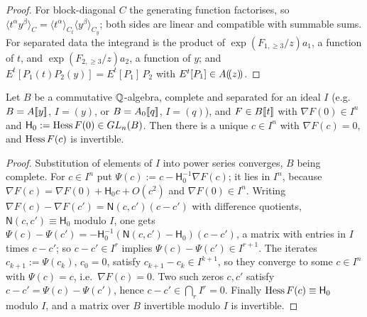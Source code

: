 \begin{proof}
For block-diagonal $C$ the generating function factorises, so $\langle t^\alpha y^\beta\rangle_C=\langle t^\alpha\rangle_{C_t}\langle y^\beta\rangle_{C_y}$; both sides are linear and compatible with summable sums. For separated data the integrand is the product of $\exp(F_{1,\geq3}/z)a_1$, a function of $t$, and $\exp(F_{2,\geq3}/z)a_2$, a function of $y$; and $E^t[P_1(t)P_2(y)]=E^t[P_1]\,P_2$ with $E^t[P_1]\in A(\!(z)\!)$.
\end{proof}

\begin{lem}
\label{lem:fsp-ift}
Let $B$ be a commutative $\mathbb{Q}$-algebra, complete and separated for an ideal $I$ (e.g.\ $B=A[\![ y ]\!]$, $I=(y)$, or $B=A_0[\![ q ]\!]$, $I=(q)$), and $F\in B[\![ t ]\!]$ with $\nabla F(0)\in I^n$ and $\mathsf H_0:=\operatorname{Hess} F(0)\in GL_n(B)$. Then there is a unique $c\in I^n$ with $\nabla F(c)=0$, and $\operatorname{Hess} F(c)$ is invertible.
\end{lem}

\begin{proof}
Substitution of elements of $I$ into power series converges, $B$ being complete. For $c\in I^n$ put $\Psi(c):=c-\mathsf H_0^{-1}\nabla F(c)$; it lies in $I^n$, because $\nabla F(c)=\nabla F(0)+\mathsf H_0c+O(c^2)$ and $\nabla F(0)\in I^n$. Writing $\nabla F(c)-\nabla F(c')=\mathsf N(c,c')(c-c')$ with difference quotients, $\mathsf N(c,c')\equiv\mathsf H_0$ modulo $I$, one gets $\Psi(c)-\Psi(c')=-\mathsf H_0^{-1}(\mathsf N(c,c')-\mathsf H_0)(c-c')$, a matrix with entries in $I$ times $c-c'$; so $c-c'\in I^r$ implies $\Psi(c)-\Psi(c')\in I^{r+1}$. The iterates $c_{k+1}:=\Psi(c_k)$, $c_0=0$, satisfy $c_{k+1}-c_k\in I^{k+1}$, so they converge to some $c\in I^n$ with $\Psi(c)=c$, i.e.\ $\nabla F(c)=0$. Two such zeros $c,c'$ satisfy $c-c'=\Psi(c)-\Psi(c')$, hence $c-c'\in\bigcap_rI^r=0$. Finally $\operatorname{Hess} F(c)\equiv\mathsf H_0$ modulo $I$, and a matrix over $B$ invertible modulo $I$ is invertible.
\end{proof}


